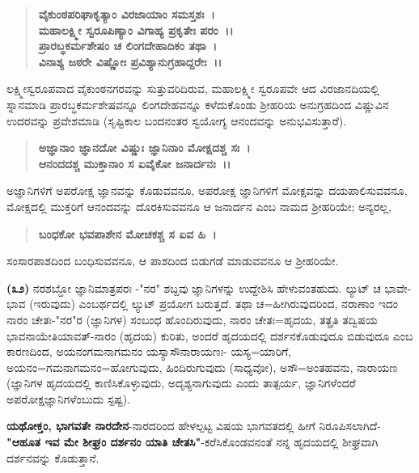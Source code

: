 \begin{verse}
\textbf{ವೈಕುಂಠಪರಿಘಾಕೃತ್ಯಾಂ ವಿರಜಾಯಾಂ ಸಮಸ್ತಶಃ~।}\\\textbf{ಮಹಾಲಕ್ಷ್ಮೀ ಸ್ವರೂಪಿಣ್ಯಾಂ ವಿಗಾಹ್ಯ ಪ್ರಕೃತೇಃ ಪರಂ~।।}\\\textbf{ಪ್ರಾರಬ್ಧಕರ್ಮಶೇಷಂ ಚ ಲಿಂಗದೇಹಾದಿಕಂ ತಥಾ~।}\\\textbf{ವಿನಾಶ್ಯ ಜಠರೇ ವಿಷ್ಣೋಃ ಪ್ರವಿಶ್ಯಾನುಗ್ರಹಾದ್ದರೇಃ~।।}
\end{verse}


ಲಕ್ಷ್ಮೀಸ್ವರೂಪವಾದ ವೈಕುಂಠನಗರವನ್ನು ಸುತ್ತುವರಿದಿರುವ, ಮಹಾಲಕ್ಷ್ಮೀ ಸ್ವರೂಪವೇ ಆದ ವಿರಜಾನದಿಯಲ್ಲಿ ಸ್ನಾನಮಾಡಿ ಪ್ರಾರಬ್ಧಕರ್ಮಶೇಷವನ್ನೂ ಲಿಂಗದೇಹವನ್ನೂ ಕಳೆದುಕೊಂಡು ಶ‍್ರೀಹರಿಯ ಅನುಗ್ರಹದಿಂದ ವಿಷ್ಣುವಿನ ಉದರವನ್ನು ಪ್ರವೇಶಮಾಡಿ (ಸೃಷ್ಟಿಕಾಲ ಬಂದನಂತರ ಸ್ವಯೋಗ್ಯ ಆನಂದವನ್ನು ಅನುಭವಿಸುತ್ತಾರೆ).

\begin{verse}
\textbf{ಅಜ್ಞಾನಾಂ ಜ್ಞಾನದೋ ವಿಷ್ಣುಃ ಜ್ಞಾನಿನಾಂ ಮೋಕ್ಷದಶ್ಚ ಸಃ~।}\\\textbf{ಆನಂದದಶ್ಚ ಮುಕ್ತಾನಾಂ ಸ ಏವೈಕೋ ಜನಾರ್ದನಃ~।।}
\end{verse}


ಅಜ್ಞಾನಿಗಳಿಗೆ ಅಪರೋಕ್ಷ ಜ್ಞಾನವನ್ನು ಕೊಡುವವನೂ, ಅಪರೋಕ್ಷ ಜ್ಞಾನಿಗಳಿಗೆ ಮೋಕ್ಷವನ್ನು ದಯಪಾಲಿಸುವವನೂ, ಮೋಕ್ಷದಲ್ಲಿ ಮುಕ್ತರಿಗೆ ಆನಂದವನ್ನು ದೊರಕಿಸುವವನೂ ಆ ಜನಾರ್ದನ ಎಂಬ ನಾಮದ ಶ‍್ರೀಹರಿಯೇ; ಅನ್ಯರಲ್ಲ,

\begin{verse}
\textbf{ಬಂಧಕೋ ಭವಪಾಶೇನ ಮೋಚಕಶ್ಚ ಸ ಏವ ಹಿ~।}
\end{verse}


ಸಂಸಾರಪಾಶದಿಂದ ಬಂಧಿಸುವವನೂ, ಆ ಪಾಶದಿಂದ ಬಿಡುಗಡೆ ಮಾಡುವವನೂ ಆ ಶ‍್ರೀಹರಿಯೇ.

\textbf{(೩೨)} ನರಶಬ್ದೋ ಜ್ಞಾನಿಮಾತ್ರಪರಃ -"ನರ" ಶಬ್ದವು ಜ್ಞಾನಿಗಳನ್ನು ಉದ್ದೇಶಿಸಿ ಹೇಳು\-ವಂತಹುದು. ಲ್ಯುಟ್ ಚ ಭಾವೇ-ಭಾವ (ಇರುವುದು) ಎಂಬರ್ಥದಲ್ಲಿ ಲ್ಯುಟ್ ಪ್ರಯೋಗ ಬರುತ್ತದೆ. ತಥಾ ಚ=ಹೀಗಿರುವುದರಿಂದ, ನರಾಣಾಂ ಇದಂ ನಾರಂ ಚೇತಃ-"ನರ"ರ (ಜ್ಞಾನಿಗಳ) ಸಂಬಂಧ ಹೊಂದಿರುವುದು, ನಾರಂ ಚೇತಃ=ಹೃದಯ, ತತ್ಪ್ರತಿ ತದ್ವಿಷಯ ಭಾವನಾಯೇತಿಯಾವತ್-ನಾರಂ (ಹೃದಯ) ಕುರಿತು, ಅಂದರೆ ಹೃದಯದಲ್ಲಿ ದರ್ಶನಕೊಡುವುದೂ ಬಿಡುವುದೂ ಎಂಬ ಕಾರಣದಿಂದ, ಅಯನಂಗಮನಾಗಮನಂ ಯಸ್ಯಾಸೌ\break ನಾರಾಯಣಃ- ಯಸ್ಯ=ಯಾರಿಗೆ, ಅಯನಂ=ಗಮನಾಗಮನಂ=ಹೋಗುವುದು, ಹಿಂದಿರು\-ಗುವುದು (ಸಾಧ್ಯವೋ), ಅಸೌ=ಅಂತಹವನು, ನಾರಾಯಣ (ಜ್ಞಾನಿಗಳ ಹೃದಯದಲ್ಲಿ ಕಾಣಿಸಿ\-ಕೊಳ್ಳುವುದು, ಅದೃಶ್ಯನಾಗುವುದು ಎಂದು ತಾತ್ಪರ್ಯ, ಜ್ಞಾನಿಗಳೆಂದರೆ ಅಪರೋಕ್ಷ\-ಜ್ಞಾನಿಗಳೆಂಬುದು ಸ್ಪಷ್ಟ).

\textbf{ಯಥೋಕ್ತಂ, ಭಾಗವತೇ ನಾರದೇನ}-ನಾರದರಿಂದ ಹೇಳಲ್ಪಟ್ಟ ವಿಷಯ ಭಾಗವತದಲ್ಲಿ ಹೀಗೆ ನಿರೂಪಿಸಲಾಗಿದೆ-\textbf{"ಆಹೂತ ಇವ ಮೇ ಶೀಘ್ರಂ ದರ್ಶನಂ ಯಾತಿ ಚೇತಸಿ"}\break -ಕರೆಸಿಕೊಂಡವನಂತೆ ನನ್ನ ಹೃದಯದಲ್ಲಿ ಶೀಘ್ರವಾಗಿ ದರ್ಶನವನ್ನು ಕೊಡುತ್ತಾನೆ.


